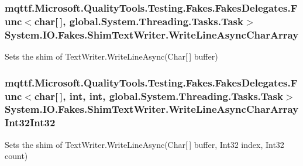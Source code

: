 \hypertarget{class_system_1_1_i_o_1_1_fakes_1_1_shim_text_writer_a3fcbdbadef8c43dc2823d479df07d075}{
\subsubsection[{Write\-Line\-Async\-Char\-Array}]{\setlength{\rightskip}{0pt plus 5cm}mqttf.\-Microsoft.\-Quality\-Tools.\-Testing.\-Fakes.\-Fakes\-Delegates.\-Func$<$char\mbox{[}$\,$\mbox{]}, global.\-System.\-Threading.\-Tasks.\-Task$>$ System.\-I\-O.\-Fakes.\-Shim\-Text\-Writer.\-Write\-Line\-Async\-Char\-Array\hspace{0.3cm}{\ttfamily [set]}}}\label{class_system_1_1_i_o_1_1_fakes_1_1_shim_text_writer_a3fcbdbadef8c43dc2823d479df07d075}


Sets the shim of Text\-Writer.\-Write\-Line\-Async(\-Char\mbox{[}$\,$\mbox{]} buffer)

\hypertarget{class_system_1_1_i_o_1_1_fakes_1_1_shim_text_writer_a50f6c3930f352648a5c07ef30f7354d6}{
\subsubsection[{Write\-Line\-Async\-Char\-Array\-Int32\-Int32}]{\setlength{\rightskip}{0pt plus 5cm}mqttf.\-Microsoft.\-Quality\-Tools.\-Testing.\-Fakes.\-Fakes\-Delegates.\-Func$<$char\mbox{[}$\,$\mbox{]}, int, int, global.\-System.\-Threading.\-Tasks.\-Task$>$ System.\-I\-O.\-Fakes.\-Shim\-Text\-Writer.\-Write\-Line\-Async\-Char\-Array\-Int32\-Int32\hspace{0.3cm}{\ttfamily [set]}}}\label{class_system_1_1_i_o_1_1_fakes_1_1_shim_text_writer_a50f6c3930f352648a5c07ef30f7354d6}


Sets the shim of Text\-Writer.\-Write\-Line\-Async(\-Char\mbox{[}$\,$\mbox{]} buffer, Int32 index, Int32 count)

